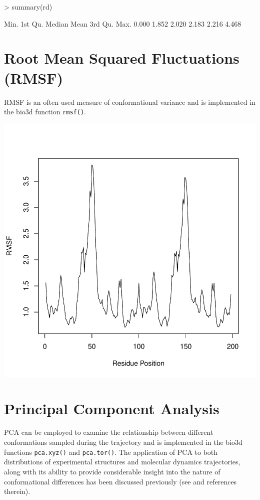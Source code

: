 \documentclass[letter]{article}
\begin{document}
\begin{Schunk}
\begin{Sinput}
> summary(rd)
\end{Sinput}
\begin{Soutput}
   Min. 1st Qu.  Median    Mean 3rd Qu.    Max. 
  0.000   1.852   2.020   2.183   2.216   4.468 
\end{Soutput}
\end{Schunk}

\section{Root Mean Squared Fluctuations (RMSF)}
RMSF is an often used measure of conformational variance and is implemented in the bio3d function \texttt{rmsf()}.
\begin{Schunk}
\end{Schunk}
\includegraphics{Bio3D_trajectory-011}

\section{Principal Component Analysis}
PCA can be employed to examine the relationship between different conformations sampled during the trajectory and is implemented in the bio3d functions \texttt{pca.xyz()} and \texttt{pca.tor()}. The application of PCA to both distributions of experimental structures and molecular dynamics trajectories, along with its ability to provide considerable insight into the nature of conformational differences has been discussed previously (see \citet{grant06} and references therein). 
\end{document}

